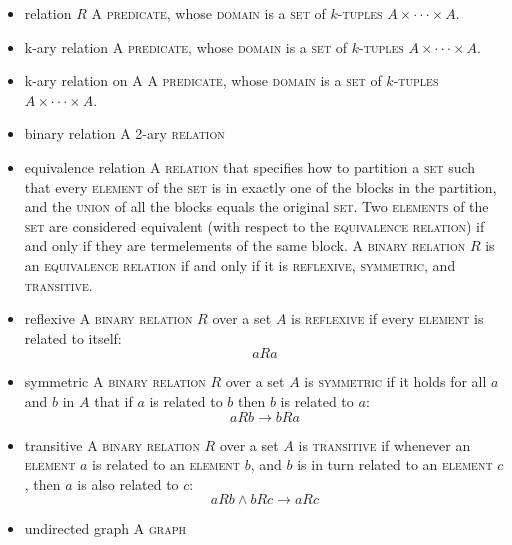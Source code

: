 \documentclass{article}
\newcommand{\term}[1]{\textsc{#1}}
\begin{document}
\bigskip \indent
\begin{itemize}
\item relation $R$
  \subitem A \term{predicate}, whose \term{domain} is a \term{set} of \term{$k$-tuples} $A \times \cdot \cdot \cdot \times A$.
\item k-ary relation
  \subitem A \term{predicate}, whose \term{domain} is a \term{set} of \term{$k$-tuples} $A \times \cdot \cdot \cdot \times A$.
\item k-ary relation on A
  \subitem A \term{predicate}, whose \term{domain} is a \term{set} of \term{$k$-tuples} $A \times \cdot \cdot \cdot \times A$.
\item binary relation
  \subitem A 2-ary \term{relation}
\item equivalence relation
  \subitem A \term{relation} that specifies how to partition a \term{set} such that every \term{element} of the \term{set} is in exactly one of the blocks in the partition, and the \term{union} of all the blocks equals the original \term{set}. Two \term{elements} of the \term{set} are considered equivalent (with respect to the \term{equivalence relation}) if and only if they are term{elements} of the same block. A \term{binary relation} $R$ is an \term{equivalence relation} if and only if it is \term{reflexive}, \term{symmetric}, and \term{transitive}.
\item reflexive
  \subitem A \term{binary relation} $R$ over a set $A$ is \term{reflexive} if every \term{element} is related to itself: $$aRa$$
\item symmetric
  \subitem A \term{binary relation} $R$ over a set $A$ is \term{symmetric} if it holds for all $a$ and $b$ in $A$ that if $a$ is related to $b$ then $b$ is related to $a$: $$aRb  \rightarrow bRa$$
\item transitive
  \subitem A \term{binary relation} $R$ over a set $A$ is \term{transitive} if whenever an \term{element} $a$ is related to an \term{element} $b$, and $b$ is in turn related to an \term{element} $c$, then $a$ is also related to $c$: $$aRb \wedge bRc \rightarrow aRc$$
\item undirected graph
  \subitem A \term{graph}
\end{itemize}
\end{document}

